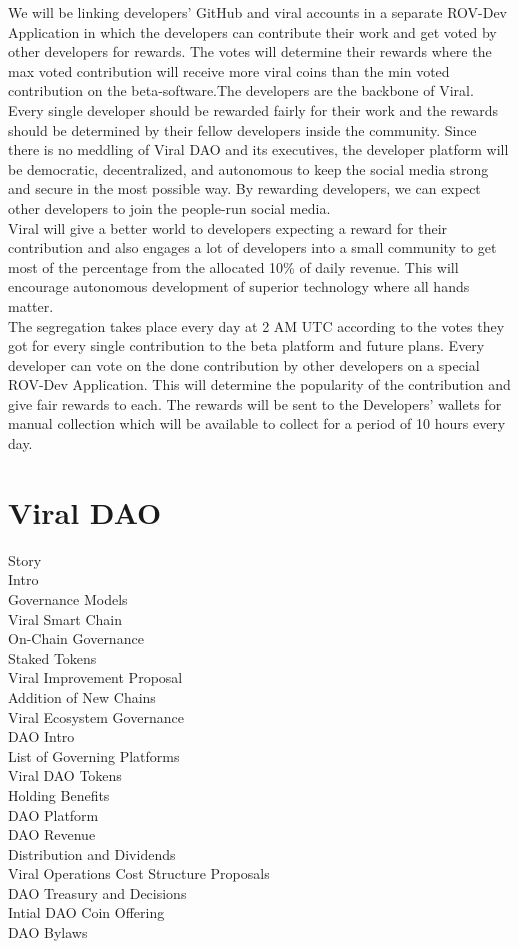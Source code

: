 \documentclass[10pt]{article}
\begin{document}
We will be linking developers' GitHub and viral accounts in a separate ROV-Dev Application in which the developers can contribute their work and get voted by other developers for rewards. The votes will determine their rewards where the max voted contribution will receive more viral coins than the min voted contribution on the beta-software.The developers are the backbone of Viral. Every single developer should be rewarded fairly for their work and the rewards should be determined by their fellow developers inside the community. Since there is no meddling of Viral DAO and its executives, the developer platform will be democratic, decentralized, and autonomous to keep the social media strong and secure in the most possible way. By rewarding developers, we can expect other developers to join the people-run social media.\\

Viral will give a better world to developers expecting a reward for their contribution and also engages a lot of developers into a small community to get most of the percentage from the allocated 10\% of daily revenue. This will encourage autonomous development of superior technology where all hands matter. \\

The segregation takes place every day at 2 AM UTC according to the votes they got for every single contribution to the beta platform and future plans. Every developer can vote on the done contribution by other developers on a special ROV-Dev Application. This will determine the popularity of the contribution and give fair rewards to each. The rewards will be sent to the Developers' wallets for manual collection which will be available to collect for a period of 10 hours every day.\\


\section{Viral DAO}

Story\\
Intro\\
Governance Models\\
Viral Smart Chain\\
On-Chain Governance\\
Staked Tokens\\
Viral Improvement Proposal\\
Addition of New Chains\\
Viral Ecosystem Governance\\
DAO Intro\\
List of Governing Platforms\\
Viral DAO Tokens\\
Holding Benefits\\
DAO Platform\\
DAO Revenue\\
Distribution and Dividends\\
Viral Operations Cost Structure Proposals\\
DAO Treasury and Decisions\\
Intial DAO Coin Offering\\
DAO Bylaws\\
\end{document}
